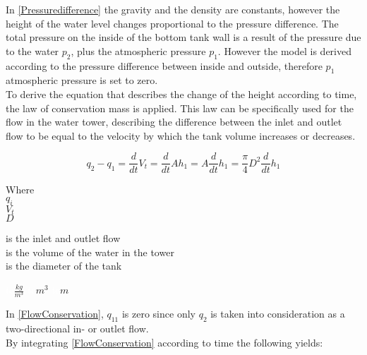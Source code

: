 In \eqref{Pressuredifference} the gravity and the density are constants, however the height of the water level changes proportional to the pressure difference. The total pressure on the inside of the bottom tank wall is a result of the pressure due to the water $p_2$, plus the
atmospheric pressure $p_1$. However the model is derived according to the pressure difference between inside and outside, therefore $p_1$ atmospheric pressure is set to zero. 
\\
To derive the equation that describes the change of the height according to 
time, the law of conservation mass is applied. This law can be specifically used for the flow in the water tower, describing the difference between the inlet and outlet flow to be equal to the velocity by which the tank volume increases or decreases. 

\begin{equation}
  q_{2} - q_{1} = \frac{d}{dt}V_t = \frac{d}{dt}Ah_1 = A \frac{d}{dt}h_1 = \frac{\pi}{4} D^2 \frac{d}{dt} h_1
  \label{FlowConservation}
\end{equation}


\begin{minipage}[t]{0.20\textwidth}
Where\\
\hspace*{8mm} $q_i$ \\
\hspace*{8mm} $V_t$ \\
\hspace*{8mm} $D$ 
\end{minipage}
\begin{minipage}[t]{0.68\textwidth}
\vspace*{2mm}
is the inlet and outlet flow\\
is the volume of the water in the tower\\
is the diameter of the tank 
\end{minipage}
\begin{minipage}[t]{0.10\textwidth}
\vspace*{2mm}
\textcolor{White}{te}$\unit{\frac{kg}{m^3}}$
\textcolor{White}{te}$\unit{m^3}$
\textcolor{White}{te}$\unit{m}$
\end{minipage}

In \eqref{FlowConservation}, $q_11$ is zero since only $q_2$ is taken into consideration as a two-directional in- or outlet flow. 
\\
By integrating \eqref{FlowConservation} according to time the following yields:

